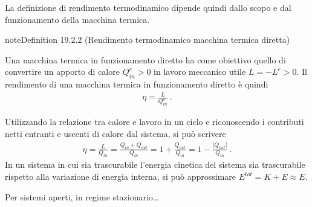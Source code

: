 \documentclass[letterpaper,10pt,italian]{jupyterBook}
\begin{document}
\sphinxAtStartPar
La definizione di rendimento termodinamico dipende quindi dallo scopo e dal funzionamento della macchina termica.
\label{ch/thermodynamics/heat-engine-td-cycles:td-efficiency-direct}
\begin{sphinxadmonition}{note}{Definition 19.2.2 (Rendimento termodinamico \sphinxhyphen{} macchina termica diretta)}



\sphinxAtStartPar
Una macchina termica in funzionamento diretto ha come obiettivo quello di convertire un apporto di calore \(Q^{e}_{in} > 0\) in lavoro meccanico utile \(L = -L^e > 0\). Il rendimento di una macchina termica in funzionamento diretto è quindi
\begin{equation*}
\begin{split}\eta = \frac{L}{Q^{e}_{in}} \ .\end{split}
\end{equation*}\end{sphinxadmonition}

\sphinxAtStartPar
Utilizzando la relazione tra calore e lavoro in un ciclo  e riconoscendo i contributi netti entranti e uscenti di calore dal sistema, si può scrivere
\begin{equation*}
\begin{split}\eta = \frac{L}{Q_{in}} = \frac{Q_{in} + Q_{out}}{Q_{in}} = 1 + \frac{Q_{out}}{Q_{in}} = 1 - \frac{|Q_{out}|}{Q_{in}} \ .\end{split}
\end{equation*}
\sphinxAtStartPar
{} In un sistema in cui sia trascurabile l’energia cinetica del sistema sia trascurabile rispetto alla variazione di energia interna, si può approssimare \(E^{tot} = K + E \approx E\).

\sphinxAtStartPar
{} Per sistemi aperti, in regime stazionario…

\sphinxstepscope
\end{document}
